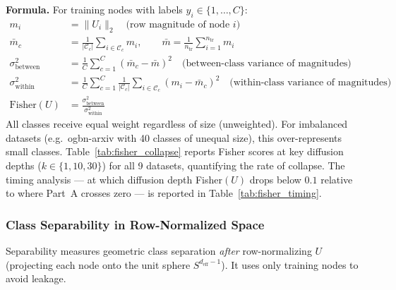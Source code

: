 \documentclass[11pt]{article}
\begin{document}
\textbf{Formula.}  For training nodes with labels $y_i \in \{1,\ldots,C\}$:
\begin{align}
  m_i &= \|U_i\|_2 \quad \text{(row magnitude of node } i\text{)} \\
  \bar{m}_c &= \frac{1}{|\mathcal{C}_c|}\sum_{i \in \mathcal{C}_c} m_i, \qquad
  \bar{m} = \frac{1}{n_{\mathrm{tr}}}\sum_{i=1}^{n_{\mathrm{tr}}} m_i \\
  \sigma^2_{\mathrm{between}} &= \frac{1}{C}\sum_{c=1}^{C}(\bar{m}_c - \bar{m})^2
  \quad \text{(between-class variance of magnitudes)} \\
  \sigma^2_{\mathrm{within}} &= \frac{1}{C}\sum_{c=1}^{C}
    \frac{1}{|\mathcal{C}_c|}\sum_{i \in \mathcal{C}_c}(m_i - \bar{m}_c)^2
  \quad \text{(within-class variance of magnitudes)} \\
  \mathrm{Fisher}(U) &= \frac{\sigma^2_{\mathrm{between}}}{\sigma^2_{\mathrm{within}}}
  \label{eq:fisher_score}
\end{align}
All classes receive equal weight regardless of size (unweighted).
For imbalanced datasets (e.g.\ ogbn-arxiv with 40 classes of unequal size),
this over-represents small classes.
Table~\ref{tab:fisher_collapse} reports Fisher scores at key diffusion depths
($k \in \{1, 10, 30\}$) for all 9 datasets, quantifying the rate of collapse.
The timing analysis --- at which diffusion depth Fisher$(U)$ drops below $0.1$
relative to where Part~A crosses zero --- is reported in Table~\ref{tab:fisher_timing}.

\subsubsection*{Class Separability in Row-Normalized Space}

Separability measures geometric class separation \emph{after} row-normalizing $U$
(projecting each node onto the unit sphere $S^{d_{\mathrm{eff}}-1}$).
It uses only training nodes to avoid leakage.
\end{document}
